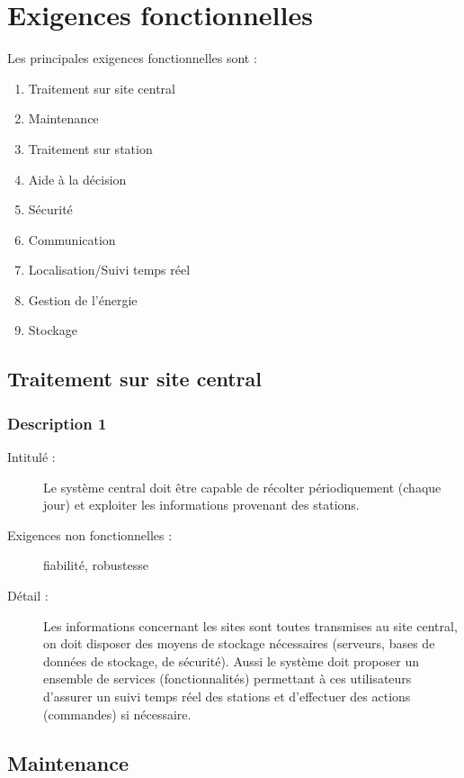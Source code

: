 \section{Exigences fonctionnelles}

Les principales exigences fonctionnelles sont :
 \begin{enumerate}
       \item Traitement sur site central
       \item Maintenance
       \item Traitement sur station
       \item Aide à la décision
       \item Sécurité
       \item Communication
       \item Localisation/Suivi temps réel
       \item Gestion de l'énergie
       \item Stockage
\end{enumerate}


\subsection {Traitement sur site central }
\subsubsection {Description 1}
\begin{description}
           \item[Intitulé :] Le système central doit être capable de récolter périodiquement (chaque jour) et exploiter les informations provenant des stations.
           \item[Exigences non fonctionnelles :]  fiabilité, robustesse
           \item[Détail :]  Les informations concernant les sites sont toutes transmises au site central, on doit disposer des moyens
de stockage nécessaires (serveurs, bases de données de stockage, de sécurité). Aussi le système doit proposer un ensemble de services (fonctionnalités) permettant à ces utilisateurs d'assurer un suivi temps réel des stations et d'effectuer des actions (commandes) si nécessaire.
\end{description}


 \subsection {Maintenance}
